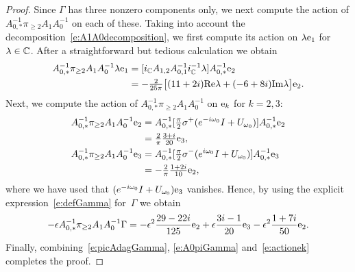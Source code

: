 \begin{proof}
Since $\Gamma$ has three nonzero components only, we next compute the action of $A_{0,*}^{-1}  \pi_{\geq 2} A_1 A_0^{-1} $ on each of these.
Taking into account the decomposition~\eqref{e:A1A0decomposition},
we first compute its action on $\lambda \mathrm{e}_1$ for $\lambda \in \mathbb{C}$.
After a straightforward but tedious calculation we obtain
\begin{alignat*}{1}
A_{0,*}^{-1}  \pi_{\geq 2} A_1 A_0^{-1}  \lambda \mathrm{e}_1
&= 
 [i_{\mathbb{C}} A_{1,2}A_{0,1}^{-1} i_{\mathbb{C}}^{-1} \lambda ] A_{0,*}^{-1} \mathrm{e}_2
\\
&= -\tfrac{2}{25\pi} \bigl[ (11+2i) \text{Re} \lambda  + (-6+8i) \text{Im} \lambda \bigr]  \mathrm{e}_2.
\end{alignat*}
Next, we compute the action of $A_{0,*}^{-1}  \pi_{\geq 2} A_1 A_0^{-1} $
on  $\mathrm{e}_k$ for $k=2,3$:
\begin{alignat*}{1}
A_{0,*}^{-1}  \pi_{\geq 2} A_1 A_0^{-1} \mathrm{e}_2
&=
 A_{0,*}^{-1} [ \tfrac{\pi}{2} \sigma^+ (  e^{-i\omega_0} I  + U_{\omega_0}) ]A_{0,*}^{-1} \mathrm{e}_2 
\\& 
=  \tfrac{2}{\pi} \tfrac{3+i}{20} \mathrm{e}_3  ,
  \\
A_{0,*}^{-1}  \pi_{\geq 2} A_1 A_0^{-1} \mathrm{e}_3
&=
 A_{0,*}^{-1} [ \tfrac{\pi}{2} \sigma^- ( e^{i\omega_0} I + U_{\omega_0}) ]A_{0,*}^{-1} \mathrm{e}_3  \\
& = 
-\tfrac{2}{\pi} \tfrac{1+2i}{10}  \mathrm{e}_2 ,
\end{alignat*}
where we have used that $(e^{-i\omega_0}I + U_{\omega_0}) \mathrm{e}_3$ vanishes.
Hence, by using the explicit expression~\eqref{e:defGamma} for~$\Gamma$ we obtain
\begin{equation}\label{e:actionek}
- \epsilon A_{0,*}^{-1}  \pi_{\geq 2}  A_1 A_0^{-1} \Gamma 
= 
 -\epsilon^2 \frac{29-22i}{125} \mathrm{e}_2 + \epsilon \frac{3i-1}{20} \mathrm{e}_3 -\epsilon^2 \frac{1+7i}{50} \mathrm{e}_2.
\end{equation}
Finally, combining~\eqref{e:picAdagGamma}, \eqref{e:A0piGamma} and~\eqref{e:actionek} completes the proof.
%

\end{proof}
